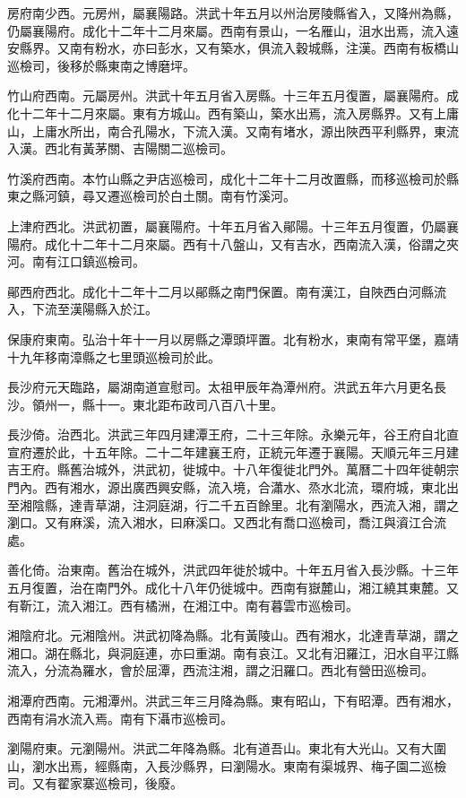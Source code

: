 房府南少西。元房州，屬襄陽路。洪武十年五月以州治房陵縣省入，又降州為縣，仍屬襄陽府。成化十二年十二月來屬。西南有景山，一名雁山，沮水出焉，流入遠安縣界。又南有粉水，亦曰彭水，又有築水，俱流入穀城縣，注漢。西南有板橋山巡檢司，後移於縣東南之博磨坪。

竹山府西南。元屬房州。洪武十年五月省入房縣。十三年五月復置，屬襄陽府。成化十二年十二月來屬。東有方城山。西有築山，築水出焉，流入房縣界。又有上庸山，上庸水所出，南合孔陽水，下流入漢。又南有堵水，源出陜西平利縣界，東流入漢。西北有黃茅關、吉陽關二巡檢司。

竹溪府西南。本竹山縣之尹店巡檢司，成化十二年十二月改置縣，而移巡檢司於縣東之縣河鎮，尋又遷巡檢司於白土關。南有竹溪河。

上津府西北。洪武初置，屬襄陽府。十年五月省入鄖陽。十三年五月復置，仍屬襄陽府。成化十二年十二月來屬。西有十八盤山，又有吉水，西南流入漢，俗謂之夾河。南有江口鎮巡檢司。

鄖西府西北。成化十二年十二月以鄖縣之南門保置。南有漢江，自陜西白河縣流入，下流至漢陽縣入於江。

保康府東南。弘治十年十一月以房縣之潭頭坪置。北有粉水，東南有常平堡，嘉靖十九年移南漳縣之七里頭巡檢司於此。

長沙府元天臨路，屬湖南道宣慰司。太祖甲辰年為潭州府。洪武五年六月更名長沙。領州一，縣十一。東北距布政司八百八十里。

長沙倚。治西北。洪武三年四月建潭王府，二十三年除。永樂元年，谷王府自北直宣府遷於此，十五年除。二十二年建襄王府，正統元年遷于襄陽。天順元年三月建吉王府。縣舊治城外，洪武初，徙城中。十八年復徙北門外。萬曆二十四年徙朝宗門內。西有湘水，源出廣西興安縣，流入境，合瀟水、烝水北流，環府城，東北出至湘陰縣，達青草湖，注洞庭湖，行二千五百餘里。北有瀏陽水，西流入湘，謂之瀏口。又有麻溪，流入湘水，曰麻溪口。又西北有喬口巡檢司，喬江與澬江合流處。

善化倚。治東南。舊治在城外，洪武四年徙於城中。十年五月省入長沙縣。十三年五月復置，治在南門外。成化十八年仍徙城中。西南有嶽麓山，湘江繞其東麓。又有靳江，流入湘江。西有橘洲，在湘江中。南有暮雲市巡檢司。

湘陰府北。元湘陰州。洪武初降為縣。北有黃陵山。西有湘水，北達青草湖，謂之湘口。湖在縣北，與洞庭連，亦曰重湖。南有哀江。又北有汨羅江，汨水自平江縣流入，分流為羅水，會於屈潭，西流注湘，謂之汨羅口。西北有營田巡檢司。

湘潭府西南。元湘潭州。洪武三年三月降為縣。東有昭山，下有昭潭。西有湘水，西南有涓水流入焉。南有下灄市巡檢司。

瀏陽府東。元瀏陽州。洪武二年降為縣。北有道吾山。東北有大光山。又有大圍山，瀏水出焉，經縣南，入長沙縣界，曰瀏陽水。東南有渠城界、梅子園二巡檢司。又有翟家寨巡檢司，後廢。

